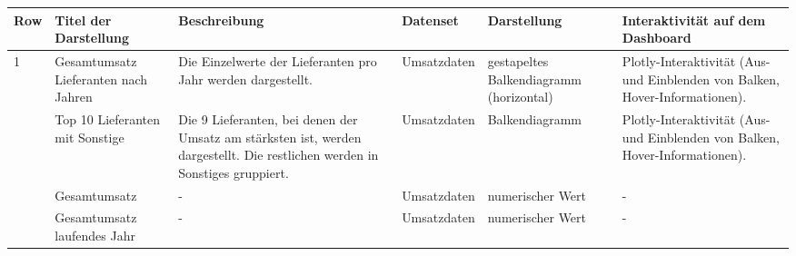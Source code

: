     \clearpage
    \recalctypearea  
    \begingroup
    \setlength{\tabcolsep}{12pt} %
    \renewcommand{\arraystretch}{1.5}
    \begin{table}[h]
        \LARGE
        \centering
        \begin{adjustbox}{max width=\textwidth}
        \begin{tabular}{p{}p{}p{}p{}p{}p{}}
           \toprule
           Row        &Titel der Darstellung&Beschreibung &Datenset &Darstellung &Interaktivität auf dem Dashboard\\
           \midrule
            1           &Gesamtumsatz Lieferanten nach Jahren &Die Einzelwerte der Lieferanten pro Jahr werden dargestellt.   &Umsatzdaten    &gestapeltes Balkendiagramm (horizontal)    &Plotly-Interaktivität (Aus- und Einblenden von Balken, Hover-Informationen).\\
                        &Top 10 Lieferanten mit Sonstige &Die 9 Lieferanten, bei denen der Umsatz am stärksten ist, werden dargestellt. Die restlichen werden in Sonstiges gruppiert.   &Umsatzdaten    &Balkendiagramm    &Plotly-Interaktivität (Aus- und Einblenden von Balken, Hover-Informationen).\\
                        &Gesamtumsatz&-&Umsatzdaten    &numerischer Wert   &-\\
                        &Gesamtumsatz laufendes Jahr&-&Umsatzdaten    &numerischer Wert   &-\\
            

\end{tabular}
\end{adjustbox}
\end{table}
